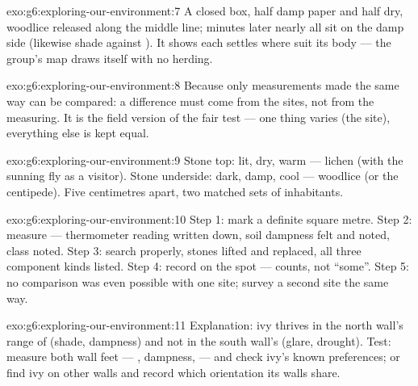\begin{solution}{exo:g6:exploring-our-environment:7}
A closed box, half damp paper and half dry, woodlice released
along the middle line; minutes later nearly all sit on the
damp side (likewise shade against ). It shows each
 settles where  suit its body --- the group's
map draws itself with no herding.
\end{solution}

\begin{solution}{exo:g6:exploring-our-environment:8}
Because only measurements made the same way can be compared:
a difference must come from the sites, not from the
measuring. It is the field version of the fair test --- one
thing varies (the site), everything else is kept equal.
\end{solution}

\begin{solution}{exo:g6:exploring-our-environment:9}
Stone top: lit, dry, warm --- lichen (with the sunning fly as
a visitor). Stone underside: dark, damp, cool --- woodlice
(or the centipede). Five centimetres apart, two matched sets
of inhabitants.
\end{solution}

\begin{solution}{exo:g6:exploring-our-environment:10}
Step 1: mark a definite square metre. Step 2: measure ---
thermometer reading written down, soil dampness felt and
noted,  class noted. Step 3: search properly, stones
lifted and replaced, all three component kinds listed. Step
4: record on the spot --- counts, not ``some''. Step 5: no
comparison was even possible with one site; survey a second
site the same way.
\end{solution}

\begin{solution}{exo:g6:exploring-our-environment:11}
Explanation: ivy thrives in the north wall's range of
 (shade, dampness) and not in the south wall's
(glare, drought). Test: measure both wall feet ---
, dampness,  --- and check ivy's known
preferences; or find ivy on other walls and record which
orientation its walls share.
\end{solution}

